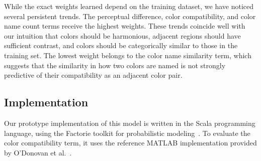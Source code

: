 While the exact weights learned depend on the training dataset, we have noticed several persistent trends.
The perceptual difference, color compatibility, and color name count terms receive the highest weights. These trends coincide well with our intuition that colors should be harmonious, adjacent regions should have sufficient contrast, and colors should be categorically similar to those in the training set.
The lowest weight belongs to the color name similarity term, which suggests that the similarity in how two colors are named is not strongly predictive of their compatibility as an adjacent color pair.

\subsection{Implementation}
\label{sec:implementation}

Our prototype implementation of this model is written in the Scala programming language, using the Factorie toolkit for probabilistic modeling~\cite{Factorie}. To evaluate the color compatibility term, it uses the reference MATLAB implementation provided by O'Donovan et al.~.
